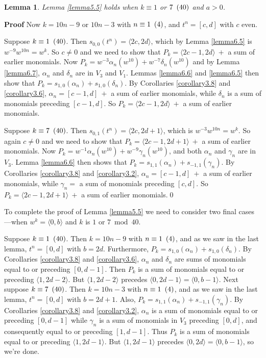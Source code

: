\documentclass{monsky2009}
\newenvironment{proof}[1][]{\textbf{Proof #1\hspace{.3em}}}{}
\newtheorem{lemma}[definition]{Lemma}
\newcommand{\mod}[1]{\ensuremath{\hspace{.5em}(#1)}}
\begin{document}
\begin{lemma}%
\label{lemma7.3}
Lemma \ref{lemma5.5} holds when $k\equiv 1$ or $7\mod{40}$ and $a>0$.
\end{lemma}

\begin{proof}
Now $k=10n-9$ or $10n-3$ with $n\equiv 1\mod{4}$, and $t^{n}=[c,d]$ with $c$ even.

Suppose $k\equiv 1\mod{40}$. Then $s_{0,0}(t^{n})=\langle 2c,2d\rangle$, which by Lemma \ref{lemma6.5} is $w^{-9}w^{10n}=w^{k}$. So $c\ne 0$ and we need to show that $P_{k}=\langle 2c-1,2d\rangle \ +$ a sum of earlier monomials. Now $P_{k}=w^{-3}\alpha_{n}(w^{10})+w^{-7}\delta_{n}(w^{10})$ and by Lemma \ref{lemma6.7}, $\alpha_{n}$ and $\delta_{n}$ are in $V_{3}$ and $V_{1}$. Lemmas \ref{lemma6.6} and \ref{lemma6.5} then show that $P_{k}=s_{1,0}(\alpha_{n})+s_{1,0}(\delta_{n})$. By Corollaries \ref{corollary3.8} and \ref{corollary3.6}, $\alpha_{n}=[c-1,d]\ +$ a sum of earlier monomials, while $\delta_{n}$ is a sum of monomials preceding $[c-1,d]$. So $P_{k}=\langle 2c-1,2d\rangle \ +$ a sum of earlier monomials. 

Suppose $k\equiv 7\mod{40}$. Then $s_{0,1}(t^{n})=\langle 2c,2d+1\rangle$, which is $w^{-3}w^{10n}=w^{k}$. So again $c\ne 0$ and we need to show that $P_{k}=\langle 2c-1,2d+1\rangle \ +$ a sum of earlier monomials. Now $P_{k}=w^{-1}\alpha_{n}(w^{10})+w^{-9}\gamma_{n}(w^{10})$, and both $\alpha_{n}$ and $\gamma_{n}$ are in $V_{3}$. Lemma \ref{lemma6.6} then shows that $P_{k}=s_{1,1}(\alpha_{n})+s_{-1,1}(\gamma_{n})$. By Corollaries \ref{corollary3.8} and \ref{corollary3.2}, $\alpha_{n}=[c-1,d]\ +$ a sum of earlier monomials, while $\gamma_{n}=$ a sum of monomials preceding $[c,d]$. So $P_{k}=\langle 2c-1,2d+1\rangle\ +$ a sum of earlier monomials.\qed
\end{proof}

To complete the proof of Lemma \ref{lemma5.5} we need to consider two final cases---when $w^{k}=\langle 0,b\rangle$ and $k$ is $1$ or $7\bmod 40$.

Suppose $k\equiv 1\mod{40}$. Then $k=10n-9$ with $n\equiv 1\mod{4}$, and as we saw in the last lemma, $t^{n}=[0,d]$ with $b=2d$. Furthermore, $P_{k}=s_{1,0}(\alpha_{n})+s_{1,0}(\delta_{n})$. By Corollaries \ref{corollary3.8} and \ref{corollary3.6}, $\alpha_{n}$ and $\delta_{n}$ are sums of monomials equal to or preceding $[0,d-1]$. Then $P_{k}$ is a sum of monomials equal to or preceding $\langle 1,2d-2\rangle$.  But $\langle 1,2d-2\rangle$ precedes $\langle 0,2d-1\rangle = \langle 0,b-1\rangle$.  Next suppose $k\equiv 7\mod{40}$. Then $k=10n-3$ with $n\equiv 1\mod{4}$, and as we saw in the last lemma, $t^{n}=[0,d]$ with $b=2d+1$. Also, $P_{k}=s_{1,1}(\alpha_{n})+s_{-1,1}(\gamma_{n})$. By Corollaries \ref{corollary3.8} and \ref{corollary3.2}, $\alpha_{n}$ is a sum of monomials equal to or preceding $[0,d-1]$ while $\gamma_{n}$ is a sum of monomials in $V_{3}$ preceding $[0,d]$, and consequently equal to or preceding $[1,d-1]$. Thus $P_{k}$ is a sum of monomials equal to or preceding $\langle 1,2d-1\rangle$.  But $\langle 1,2d-1\rangle$ precedes $\langle 0,2d\rangle = \langle 0,b-1\rangle$, so we're done.
\end{document}
